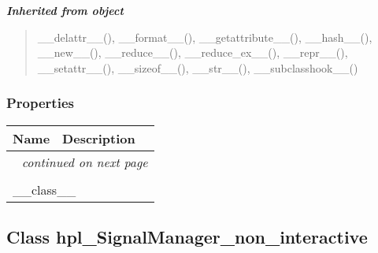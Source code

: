 \large{\textbf{\textit{Inherited from object}}}

\begin{quote}
\_\_delattr\_\_(), \_\_format\_\_(), \_\_getattribute\_\_(), \_\_hash\_\_(), \_\_new\_\_(), \_\_reduce\_\_(), \_\_reduce\_ex\_\_(), \_\_repr\_\_(), \_\_setattr\_\_(), \_\_sizeof\_\_(), \_\_str\_\_(), \_\_subclasshook\_\_()
\end{quote}


  \subsubsection{Properties}

    \vspace{-1cm}
\hspace{\varindent}\begin{longtable}{|p{\varnamewidth}|p{\vardescrwidth}|l}
\cline{1-2}
\cline{1-2} \centering \textbf{Name} & \centering \textbf{Description}& \\
\cline{1-2}
\endhead\cline{1-2}\multicolumn{3}{r}{\small\textit{continued on next page}}\\\endfoot\cline{1-2}
\endlastfoot\multicolumn{2}{|l|}{\textit{Inherited from object}}\\
\multicolumn{2}{|p{\varwidth}|}{\raggedright \_\_class\_\_}\\
\cline{1-2}
\end{longtable}



\subsection{Class hpl\_SignalManager\_non\_interactive}

